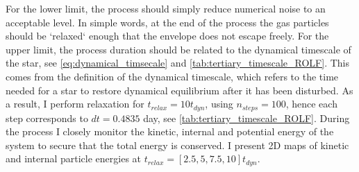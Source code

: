 For the lower limit, the process should simply reduce numerical noise to an acceptable level. In simple words, at the end of the process the gas particles should be `relaxed` enough that the envelope does not escape freely. For the upper limit, the process duration should be related to the dynamical timescale of the star, see \cref{eq:dynamical_timsecale} and \cref{tab:tertiary_timescale_ROLF}. This comes from the definition of the dynamical timescale, which refers to the time needed for a star to restore dynamical equilibrium after it has been disturbed.
As a result, I perform relaxation for $t_{relax} = 10 t_{dyn}$, using $n_{steps} = 100$, hence each step corresponds to $dt=0.4835$ day, see \cref{tab:tertiary_timescale_ROLF}.  During the process I closely monitor the kinetic, internal and potential energy of the system to secure that the total energy is conserved. I present 2D maps of kinetic and internal particle energies at $t_{relax} =[2.5, 5, 7.5, 10] t_{dyn}$.
